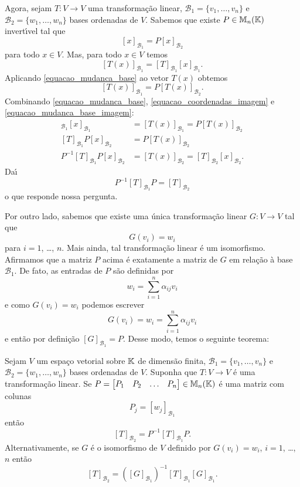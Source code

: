 Agora, sejam $T : V \to V$ uma transforma\c{c}\~ao linear, $\mathcal{B}_1 = \{v_1,\dots,v_n\}$ e $\mathcal{B}_2 = \{w_1,\dots,w_n\}$ bases ordenadas de $V$. Sabemos que existe $P \in \mathbb{M}_n(\mathbb{K})$ invert{\'\i}vel tal que
\begin{equation}\label{equacao_mudanca_base}
	[x]_{\mathcal{B}_1} = P[x]_{\mathcal{B}_2}
\end{equation}
para todo $x \in V$. Mas, para todo $x \in V$ temos
\begin{equation}\label{equacao_coordenadas_imagem}
	[T(x)]_{\mathcal{B}_1} = [T]_{\mathcal{B}_1}[x]_{\mathcal{B}_1}.
\end{equation}
Aplicando \eqref{equacao_mudanca_base} ao vetor $T(x)$ obtemos
\begin{equation}\label{equacao_mudanca_base_imagem}
	[T(x)]_{\mathcal{B}_1} = P[T(x)]_{\mathcal{B}_2}.
\end{equation}
Combinando \eqref{equacao_mudanca_base}, \eqref{equacao_coordenadas_imagem} e \eqref{equacao_mudanca_base_imagem}:
\begin{align*}
	[T]_{\mathcal{B}_1}[x]_{\mathcal{B}_1} &= [T(x)]_{\mathcal{B}_1} = P[T(x)]_{\mathcal{B}_2}\\
	[T]_{\mathcal{B}_1}P[x]_{\mathcal{B}_2} &= P[T(x)]_{\mathcal{B}_2}\\
	P^{-1}[T]_{\mathcal{B}_1}P[x]_{\mathcal{B}_2} &= [T(x)]_{\mathcal{B}_2} = [T]_{\mathcal{B}_2}[x]_{\mathcal{B}_2}.
\end{align*}
Da{\'\i}
\[
	P^{-1}[T]_{\mathcal{B}_1}P = [T]_{\mathcal{B}_2}
\]
o que responde nossa pergunta.

Por outro lado, sabemos que existe uma \'unica transforma\c{c}\~ao linear $G : V \to V$ tal que
\[
	G(v_i) = w_i
\]
para $i = 1$, \dots, $n$. Mais ainda, tal transforma\c{c}\~ao linear \'e um isomorfismo. Afirmamos que a matriz $P$ acima \'e exatamente a matriz de $G$ em rela\c{c}\~ao \`a base $\mathcal{B}_1$. De fato, as entradas de $P$ s\~ao definidas por
\[
	w_i = \sum_{i=1}^n\alpha_{ij}v_i
\]
e como $G(v_i) = w_i$ podemos escrever
\[
	G(v_i) = w_i = \sum_{i=1}^n\alpha_{ij}v_i
\]
e ent\~ao por defini\c{c}\~ao $[G]_{\mathcal{B}_1} = P$. Desse modo, temos o seguinte teorema:

\begin{teorema}
	Sejam $V$ um espa\c{c}o vetorial sobre $\mathbb{K}$ de dimens\~ao finita, $\mathcal{B}_1 = \{v_1,\dots,v_n\}$ e $\mathcal{B}_2 = \{w_1,\dots,w_n\}$ bases ordenadas de $V$. Suponha que $T : V \to V$ \'e uma transforma\c{c}\~ao linear. Se $P = \begin{bmatrix}P_1 & P_2 & \dots & P_n
	\end{bmatrix} \in \mathbb{M}_n(\mathbb{K})$ \'e uma matriz com colunas
	\[
		P_j = [w_j]_{\mathcal{B}_1}
	\]
	ent\~ao
	\[
		[T]_{\mathcal{B}_2} = P^{-1}[T]_{\mathcal{B}_1}P.
	\]
	Alternativamente, se $G$ \'e o isomorfismo de $V$ definido por $G(v_i) = w_i$, $i = 1$, \dots, $n$ ent\~ao
	\[
		[T]_{\mathcal{B}_2} = ([G]_{\mathcal{B}_1})^{-1}[T]_{\mathcal{B}_1}[G]_{\mathcal{B}_1}.
	\]
\end{teorema}

